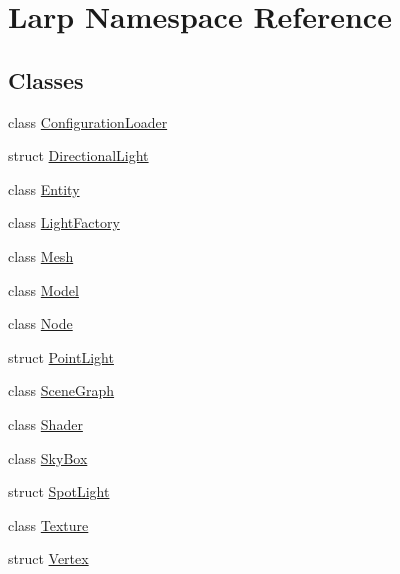 \hypertarget{namespaceLarp}{}\section{Larp Namespace Reference}
\label{namespaceLarp}
\subsection*{Classes}
\begin{DoxyCompactItemize}
\item 
class \hyperlink{classLarp_1_1ConfigurationLoader}{Configuration\+Loader}
\item 
struct \hyperlink{structLarp_1_1DirectionalLight}{Directional\+Light}
\item 
class \hyperlink{classLarp_1_1Entity}{Entity}
\item 
class \hyperlink{classLarp_1_1LightFactory}{Light\+Factory}
\item 
class \hyperlink{classLarp_1_1Mesh}{Mesh}
\item 
class \hyperlink{classLarp_1_1Model}{Model}
\item 
class \hyperlink{classLarp_1_1Node}{Node}
\item 
struct \hyperlink{structLarp_1_1PointLight}{Point\+Light}
\item 
class \hyperlink{classLarp_1_1SceneGraph}{Scene\+Graph}
\item 
class \hyperlink{classLarp_1_1Shader}{Shader}
\item 
class \hyperlink{classLarp_1_1SkyBox}{Sky\+Box}
\item 
struct \hyperlink{structLarp_1_1SpotLight}{Spot\+Light}
\item 
class \hyperlink{classLarp_1_1Texture}{Texture}
\item 
struct \hyperlink{structLarp_1_1Vertex}{Vertex}
\end{DoxyCompactItemize}
